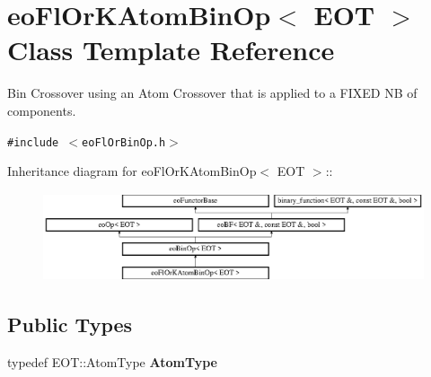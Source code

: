 \section{eo\-Fl\-Or\-KAtom\-Bin\-Op$<$ EOT $>$ Class Template Reference}
\label{classeo_fl_or_k_atom_bin_op}
Bin Crossover using an Atom Crossover that is applied to a FIXED NB of components.  


{\tt \#include $<$eo\-Fl\-Or\-Bin\-Op.h$>$}

Inheritance diagram for eo\-Fl\-Or\-KAtom\-Bin\-Op$<$ EOT $>$::\begin{figure}[H]
\begin{center}
\leavevmode
\includegraphics[height=2.60163cm]{classeo_fl_or_k_atom_bin_op}
\end{center}
\end{figure}
\subsection*{Public Types}
\begin{CompactItemize}
\item 
typedef EOT::Atom\-Type {\bf Atom\-Type}\label{classeo_fl_or_k_atom_bin_op_w0}

\end{CompactItemize}
